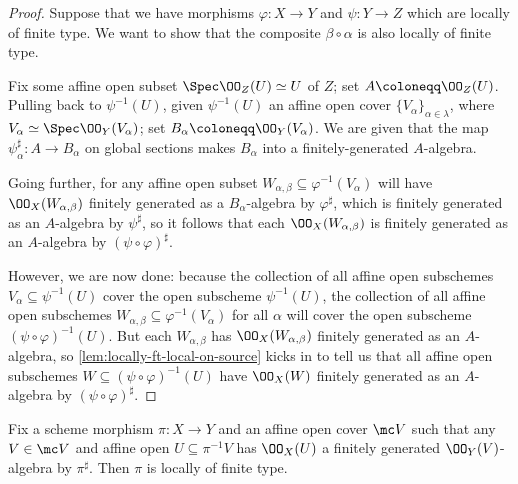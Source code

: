 \documentclass[../notes.tex]{subfiles}
\begin{document}
\begin{proof}
	Suppose that we have morphisms $\varphi\colon X\to Y$ and $\psi\colon Y\to Z$ which are locally of finite type. We want to show that the composite $\beta\circ\alpha$ is also locally of finite type.

	Fix some affine open subset $\Spec\OO_Z(U)\simeq U$ of $Z$; set $A\coloneqq\OO_Z(U)$. Pulling back to $\psi^{-1}(U)$, given $\psi^{-1}(U)$ an affine open cover $\{V_\alpha\}_{\alpha\in\lambda}$, where $V_\alpha\simeq\Spec\OO_Y(V_\alpha)$; set $B_\alpha\coloneqq\OO_Y(V_\alpha)$. We are given that the map $\psi^\sharp_\alpha\colon A\to B_\alpha$ on global sections makes $B_\alpha$ into a finitely-generated $A$-algebra.

	Going further, for any affine open subset $W_{\alpha,\beta}\subseteq\varphi^{-1}(V_\alpha)$ will have $\OO_X(W_{\alpha,\beta})$ finitely generated as a $B_\alpha$-algebra by $\varphi^\sharp$, which is finitely generated as an $A$-algebra by $\psi^\sharp$, so it follows that each $\OO_X(W_{\alpha,\beta})$ is finitely generated as an $A$-algebra by $(\psi\circ\varphi)^\sharp$.

	However, we are now done: because the collection of all affine open subschemes $V_\alpha\subseteq\psi^{-1}(U)$ cover the open subscheme $\psi^{-1}(U)$, the collection of all affine open subschemes $W_{\alpha,\beta}\subseteq\varphi^{-1}(V_\alpha)$ for all $\alpha$ will cover the open subscheme $(\psi\circ\varphi)^{-1}(U)$. But each $W_{\alpha,\beta}$ has $\OO_X(W_{\alpha,\beta})$ finitely generated as an $A$-algebra, so \autoref{lem:locally-ft-local-on-source} kicks in to tell us that all affine open subschemes $W\subseteq(\psi\circ\varphi)^{-1}(U)$ have $\OO_X(W)$ finitely generated as an $A$-algebra by $(\psi\circ\varphi)^\sharp$.
\end{proof}
\begin{lemma} \label{lem:almost-locally-ft-affine-local-target}
	Fix a scheme morphism $\pi\colon X\to Y$ and an affine open cover $\mc V$ such that any $V\in\mc V$ and affine open $U\subseteq\pi^{-1}V$ has $\OO_X(U)$ a finitely generated $\OO_Y(V)$-algebra by $\pi^\sharp$. Then $\pi$ is locally of finite type.
\end{lemma}
\end{document}
